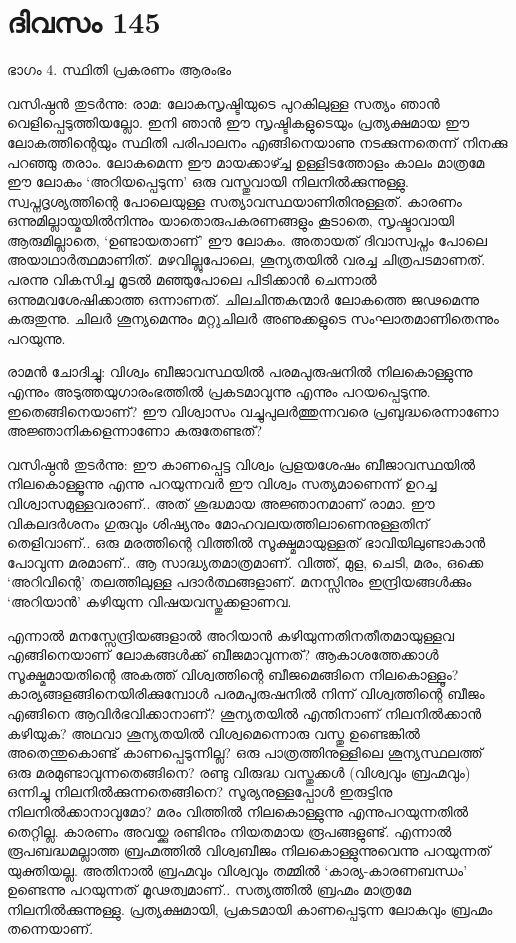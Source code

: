 \section{ദിവസം 145}

ഭാഗം 4. സ്ഥിതി പ്രകരണം ആരംഭം 


വസിഷ്ഠൻ തുടർന്നു: രാമ: ലോകസൃഷ്ടിയുടെ പുറകിലുള്ള സത്യം ഞാൻ വെളിപ്പെടുത്തിയല്ലോ. ഇനി ഞാൻ ഈ സൃഷ്ടികളുടെയും പ്രത്യക്ഷമായ ഈ ലോകത്തിന്റെയും സ്ഥിതി പരിപാലനം എങ്ങിനെയാണു നടക്കുന്നതെന്ന് നിനക്കു പറഞ്ഞു തരാം. ലോകമെന്ന ഈ മായക്കാഴ്ച്ച ഉള്ളിടത്തോളം കാലം മാത്രമേ ഈ ലോകം ‘അറിയപ്പെടുന്ന’ ഒരു വസ്തുവായി നിലനിൽക്കുന്നുള്ളു. സ്വപ്നദൃശ്യത്തിന്റെ പോലെയുള്ള സത്യാവസ്ഥയാണിതിനുള്ളത്. കാരണം ഒന്നുമില്ലായ്മയിൽനിന്നും യാതൊരുപകരണങ്ങളും കൂടാതെ, സൃഷ്ടാവായി ആരുമില്ലാതെ, ‘ഉണ്ടായതാണ്‌’ ഈ ലോകം. അതായത് ദിവാസ്വപ്നം പോലെ അയാഥാർത്ഥമാണിത്. മഴവില്ലുപോലെ, ശൂന്യതയിൽ വരച്ച ചിത്രപടമാണത്. പരന്നു വികസിച്ച മൂടൽ മഞ്ഞുപോലെ പിടിക്കാൻ ചെന്നാൽ ഒന്നുമവശേഷിക്കാത്ത ഒന്നാണത്. ചിലചിന്തകന്മാർ ലോകത്തെ ജഢമെന്നു കരുതുന്നു. ചിലർ ശൂന്യമെന്നും മറ്റുചിലർ അണുക്കളുടെ സംഘാതമാണിതെന്നും പറയുന്നു.

രാമൻ ചോദിച്ചു: വിശ്വം ബീജാവസ്ഥയിൽ പരമപുരുഷനിൽ നിലകൊള്ളുന്നു എന്നും അടുത്തയുഗാരംഭത്തിൽ പ്രകടമാവുന്നു എന്നും പറയപ്പെടുന്നു. ഇതെങ്ങിനെയാണ്‌? ഈ വിശ്വാസം വച്ചുപുലർത്തുന്നവരെ പ്രബുദ്ധരെന്നാണോ അജ്ഞാനികളെന്നാണോ കരുതേണ്ടത്?

വസിഷ്ഠൻ തുടർന്നു: ഈ കാണപ്പെട്ട വിശ്വം പ്രളയശേഷം ബീജാവസ്ഥയിൽ നിലകൊള്ളൂന്നു എന്നു പറയുന്നവർ ഈ വിശ്വം സത്യമാണെന്ന് ഉറച്ച വിശ്വാസമുള്ളവരാണ്‌.. അത് ശുദ്ധമായ അജ്ഞാനമാണ്‌ രാമാ. ഈ വികലദർശനം ഗുരുവും ശിഷ്യനും മോഹവലയത്തിലാണെനുള്ളതിന്‌ തെളിവാണ്‌.. ഒരു മരത്തിന്റെ വിത്തിൽ സൂക്ഷ്മമായുള്ളത് ഭാവിയിലുണ്ടാകാൻ പോവുന്ന മരമാണ്‌.. ആ സാദ്ധ്യതമാത്രമാണ്. വിത്ത്, മുള, ചെടി, മരം, ഒക്കെ ‘അറിവിന്റെ’ തലത്തിലുള്ള പദാർത്ഥങ്ങളാണ്‌. മനസ്സിനും ഇന്ദ്രിയങ്ങൾക്കും ‘അറിയാൻ’ കഴിയുന്ന വിഷയവസ്തുക്കളാണവ. 

എന്നാൽ മനസ്സേന്ദ്രിയങ്ങളാൽ അറിയാൻ കഴിയുന്നതിനതീതമായുള്ളവ എങ്ങിനെയാണ്‌ ലോകങ്ങൾക്ക് ബീജമാവുന്നത്? ആകാശത്തേക്കാൾ സൂക്ഷ്മമായതിന്റെ അകത്ത് വിശ്വത്തിന്റെ ബീജമെങ്ങിനെ നിലകൊള്ളൂം? കാര്യങ്ങളങ്ങിനെയിരിക്കുമ്പോൾ പരമപുരുഷനിൽ നിന്ന് വിശ്വത്തിന്റെ ബീജം എങ്ങിനെ ആവിർഭവിക്കാനാണ്‌? ശൂന്യതയിൽ എന്തിനാണ്‌ നിലനിൽക്കാൻ കഴിയുക? അഥവാ ശൂന്യതയിൽ വിശ്വമെന്നൊരു വസ്തു ഉണ്ടെങ്കിൽ അതെന്തുകൊണ്ട് കാണപ്പെടുന്നില്ല? ഒരു പാത്രത്തിനുള്ളിലെ ശൂന്യസ്ഥലത്ത് ഒരു മരമുണ്ടാവുന്നതെങ്ങിനെ? രണ്ടു വിരുദ്ധ വസ്തുക്കൾ (വിശ്വവും ബ്രഹ്മവും) ഒന്നിച്ചു നിലനിൽക്കുന്നതെങ്ങിനെ? സൂര്യനുള്ളപ്പോൾ ഇരുട്ടിനു നിലനിൽക്കാനാവുമോ? മരം വിത്തിൽ നിലകൊള്ളുന്നു എന്നുപറയുന്നതിൽ തെറ്റില്ല. കാരണം അവയ്ക്കു രണ്ടിനും നിയതമായ രൂപങ്ങളുണ്ട്. എന്നാൽ രൂപബദ്ധമല്ലാത്ത ബ്രഹ്മത്തിൽ വിശ്വബീജം നിലകൊള്ളുന്നുവെന്നു പറയുന്നത് യുക്തിയല്ല. അതിനാൽ ബ്രഹ്മവും വിശ്വവും തമ്മിൽ ‘കാര്യ-കാരണബന്ധം’ ഉണ്ടെന്നു പറയുന്നത് മൂഢത്വമാണ്‌.. സത്യത്തിൽ ബ്രഹ്മം മാത്രമേ നിലനില്‍ക്കുന്നുള്ളു. പ്രത്യക്ഷമായി, പ്രകടമായി കാണപ്പെടുന്ന ലോകവും ബ്രഹ്മം തന്നെയാണ്. 
